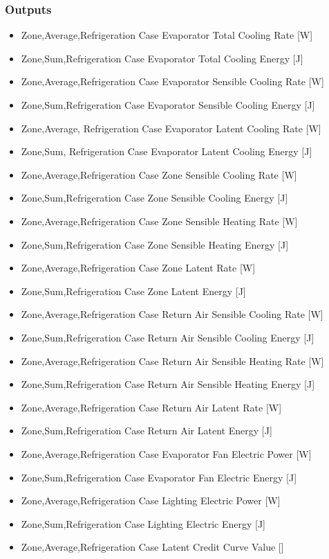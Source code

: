 \subsubsection{Outputs}\label{outputs-1-022}

\begin{itemize}
\item
  Zone,Average,Refrigeration Case Evaporator Total Cooling Rate {[}W{]}
\item
  Zone,Sum,Refrigeration Case Evaporator Total Cooling Energy {[}J{]}
\item
  Zone,Average,Refrigeration Case Evaporator Sensible Cooling Rate {[}W{]}
\item
  Zone,Sum,Refrigeration Case Evaporator Sensible Cooling Energy {[}J{]}
\item
  Zone,Average, Refrigeration Case Evaporator Latent Cooling Rate {[}W{]}
\item
  Zone,Sum, Refrigeration Case Evaporator Latent Cooling Energy {[}J{]}
\item
  Zone,Average,Refrigeration Case Zone Sensible Cooling Rate {[}W{]}
\item
  Zone,Sum,Refrigeration Case Zone Sensible Cooling Energy {[}J{]}
\item
  Zone,Average,Refrigeration Case Zone Sensible Heating Rate {[}W{]}
\item
  Zone,Sum,Refrigeration Case Zone Sensible Heating Energy {[}J{]}
\item
  Zone,Average,Refrigeration Case Zone Latent Rate {[}W{]}
\item
  Zone,Sum,Refrigeration Case Zone Latent Energy {[}J{]}
\item
  Zone,Average,Refrigeration Case Return Air Sensible Cooling Rate {[}W{]}
\item
  Zone,Sum,Refrigeration Case Return Air Sensible Cooling Energy {[}J{]}
\item
  Zone,Average,Refrigeration Case Return Air Sensible Heating Rate {[}W{]}
\item
  Zone,Sum,Refrigeration Case Return Air Sensible Heating Energy {[}J{]}
\item
  Zone,Average,Refrigeration Case Return Air Latent Rate {[}W{]}
\item
  Zone,Sum,Refrigeration Case Return Air Latent Energy {[}J{]}
\item
  Zone,Average,Refrigeration Case Evaporator Fan Electric Power {[}W{]}
\item
  Zone,Sum,Refrigeration Case Evaporator Fan Electric Energy {[}J{]}
\item
  Zone,Average,Refrigeration Case Lighting Electric Power {[}W{]}
\item
  Zone,Sum,Refrigeration Case Lighting Electric Energy {[}J{]}
\item
  Zone,Average,Refrigeration Case Latent Credit Curve Value {[]}
\end{itemize}


